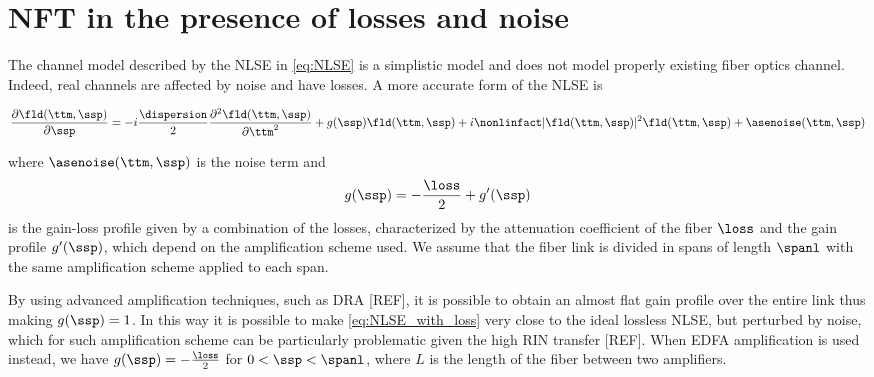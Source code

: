 \section{NFT in the presence of losses and noise}
The channel model described by the NLSE in \eqref{eq:NLSE} is a simplistic
model and does not model properly existing fiber optics channel. Indeed, real
channels are affected by noise and have losses.
A more accurate form of the NLSE is

\begin{equation}\label{eq:NLSE_with_loss}
\frac{\partial \fld(\ttm,\ssp)}{\partial \ssp} =
-i \frac{\dispersion}{2} \frac{\partial^2 \fld(\ttm,\ssp)}{\partial \ttm^2}
+ g(\ssp)\fld(\ttm,\ssp)
+ i\nonlinfact |\fld(\ttm,\ssp)|^2 \fld(\ttm,\ssp)
+ \asenoise(\ttm,\ssp)
\end{equation}

where $\asenoise(\ttm,\ssp)$ is the noise term and
\begin{equation}
 g(\ssp) = - \dfrac{\loss}{2} + g'(\ssp)
\end{equation}
is the gain-loss profile given by a combination of the losses, characterized by
the attenuation coefficient of the fiber $\loss$ and the gain profile
$g'(\ssp)$, which depend on the amplification scheme used. We assume that the
fiber link is divided in spans of length $\spanl$ with the same amplification
scheme applied to each span.

By using advanced amplification techniques, such as DRA [REF], it is possible
to obtain an almost flat gain profile over the entire link thus making $g(\ssp)
= 1 $. In this way it is possible to make \eqref{eq:NLSE_with_loss} very close
to the ideal lossless NLSE, but perturbed by noise, which for such
amplification scheme can be particularly problematic given the high RIN transfer
[REF].
When EDFA amplification is used instead, we have $g(\ssp) = - \frac{\loss}{2} $
for $0 < \ssp < \spanl$, where $L$ is the length of the fiber between two
amplifiers.

